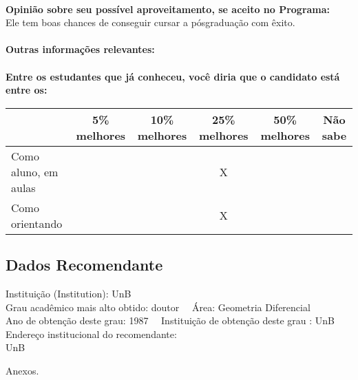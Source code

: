 \documentclass[11pt]{article}
\begin{document}
\\
\textbf{Opinião sobre seu possível aproveitamento, se aceito no Programa:}
\\Ele tem boas chances de conseguir cursar a pósgraduação com êxito.\\ 
\\
\textbf{Outras informações relevantes:} \\
\\[0.3cm]
\textbf{Entre os estudantes que já conheceu, você diria que o candidato está entre os:}
\\
\begin{tabular}{|l|c|c|c|c|c|}
\hline
 & 5\% melhores & 10\% melhores & 25\% melhores & 50\% melhores & Não sabe \\
\hline
Como aluno, em aulas &  &  & X &  & \\
\hline
Como orientando &  &  & X &  & \\
\hline
\end{tabular}
\subsection*{Dados Recomendante} 
	Instituição (Institution): UnB
\\ 
	Grau acadêmico mais alto obtido: doutor
	\ \ Área: Geometria Diferencial
	\\
	Ano de obtenção deste grau: 1987
	\ \ 
	Instituição de obtenção deste grau : UnB
	\\ 
	Endereço institucional do recomendante: \\ UnB 
\begin{center}
Anexos.
\end{center}
\end{document}
